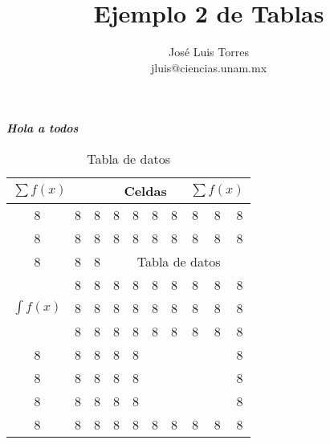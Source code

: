 \documentclass[letterpaper,11pt]{article}
\title{Ejemplo 2 de Tablas}
\author{José Luis Torres\\jluis@ciencias.unam.mx}
\newcommand{\hola}{\textbf{\textit{Hola a todos}}}
\begin{document}
\maketitle
\hola


\blindtext

\begin{table}[b]
\centering
\begin{tabular}{||c|c|c|c|c|c|c|c|c|c||}
\cline{4-7}
 \multicolumn{3}{l|}{$\sum f(x)$} & \multicolumn{4}{c}{Celdas} & \multicolumn{3}{|c}{$\sum f(x)$} \\
\hline \hline
 8 & 8 & 8 & 8 & 8 & 8 & 8 & 8 & 8 & 8 \\
\hline
 8 & 8 & 8 & 8 & 8 & 8 & 8 & 8 & 8 & 8 \\
\hline
 8 & 8 & 8 & \multicolumn{7}{|c}{Tabla de datos} \\
\hline
 \multirow{3}{1.2cm}{$\int f(x)$} & 8 & 8 & 8 & 8 & 8 & 8 & 8 & 8 & 8 \\
\cline{2-10}
  & 8 & 8 & 8 & 8 & 8 & 8 & 8 & 8 & 8 \\
\cline{2-10}
  & 8 & 8 & 8 & 8 & 8 & 8 & 8 & 8 & 8 \\
\hline \hline
 8 & 8 & 8 & 8 & 8 & \multicolumn{4}{|c|}{
 \multirow{3}{*}{$\sqrt[5]{\sum_{i=1}^n x_i}$}
 } & 8 \\
\cline{1-5}\cline{10-10}
 8 & 8 & 8 & 8 & 8 & \multicolumn{4}{c|}{} & 8 \\
\cline{1-5}\cline{10-10}
 8 & 8 & 8 & 8 & 8 & \multicolumn{4}{c|}{} & 8 \\
\hline
 8 & 8 & 8 & 8 & 8 & 8 & 8 & 8 & 8 & 8 \\
\hline
\end{tabular}
\caption{Tabla de datos}
\end{table}

\blindtext

\newpage

\blindtext


\newpage

\blindtext
\end{document}
